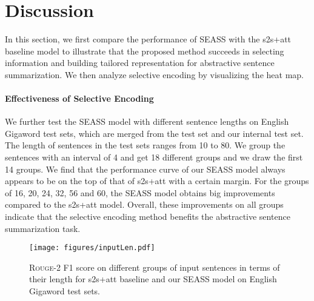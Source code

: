 \documentclass[11pt,a4paper]{article}
\newcommand{\ourModelName}{SEASS}
\begin{document}
\section{Discussion}
\label{sec:disc}


In this section, we first compare the performance of \ourModelName{} with the s2s+att baseline model to illustrate that the proposed method succeeds in selecting information and building tailored representation for abstractive sentence summarization.
We then analyze selective encoding by visualizing the heat map.



\paragraph{Effectiveness of Selective Encoding}
We further test the \ourModelName{} model with different sentence lengths on English Gigaword test sets, which are merged from the \citet{rush-chopra-weston:2015:EMNLP} test set and our internal test set.
The length of sentences in the test sets ranges from 10 to 80.
We group the sentences with an interval of 4 and get 18 different groups and we draw the first 14 groups.
We find that the performance curve of our \ourModelName{} model always appears to be on the top of that of s2s+att with a certain margin.
For the groups of 16, 20, 24, 32, 56 and 60, the \ourModelName{} model obtains big improvements compared to the s2s+att model.
Overall, these improvements on all groups indicate that the selective encoding method benefits the abstractive sentence summarization task.

\begin{figure}[htbp]
	\centering
	\texttt{[image: figures/inputLen.pdf]}
	\caption{\label{fig:gigaRougeLen} \textsc{Rouge}-2 F1 score on different groups of input sentences in terms of their length for s2s+att baseline and our \ourModelName{} model on English Gigaword test sets.}
\end{figure}
\end{document}

